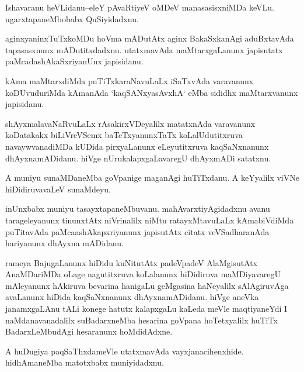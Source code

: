 \documentclass{article}
\begin{document}
\begin{mn}%
Ishavaranu heVLidanu--eleY pAvaRtiyeV oMDeV manasasisxniMDa keVLu. ugarxtapaneMbobabx 
QuSiyidadxnu.
\end{mn}

\begin{mn}%
aginxyaninxTuTxkoMDu hoVma mADutAtx aginx BakaSxkanAgi aduBxtavAda tapasasxnunx 
mADutitxdadxnu. utatxmavAda maMtarxgaLanunx japisutatx paMcadashAkaSxriyanUnx japisidanu.
\end{mn}

\begin{mn}%
kAma maMtarxdiMda puTiTxkaraNavuLaLx iSaTxvAda varavanunx koDUvuduriMda kAmanAda 
`kaqSANxyasAvxhA` eMba sididhx maMtarxvanunx japisidanu.
\end{mn}

\begin{mn}%
shAyxmalavaNaRvuLaLx rAsakirxVDeyalilx matatxnAda varavanunx koDatakakx biLiVreVSemx 
baTeTxyanunxTaTx koLalUdutitxruva navaywvanadiMDa kUDida pirxyaLanunx  eLeyutitxruva 
kaqSaNxnanunx dhAyxnamADidanu. hiVge nUrukalapxgaLavaregU dhAyxmADi satatxnu.
\end{mn}

\begin{mn}%
A muniyu sunaMDaneMba goVpanige maganAgi huTiTxdanu. A keYyalilx viVNe hiDidiruvavaLeV 
sunaMdeyu.
\end{mn}

\begin{mn}%
inUnxbabx muniyu tasayxtapaneMbuvanu. mahAvarxtiyAgidadxnu avanu tarageleyanunx tinunxtAtx 
niVrinalilx niMtu ratayxMtavuLaLx kAmabiVdiMda puTitavAda paMcaashAkapxriyanunx japisutAtx 
citatx veVSadharanAda hariyanunx dhAyxna mADidanu.
\end{mn}

\begin{mn}%
rameya BajugaLanunx hiDidu kuNitutAtx padeVpadeV AlaMgisutAtx AnaMDariMDa oLage 
nagutitxruva koLalanunx hiDidiruva maMDiyavaregU mAleyanunx hAkiruva bevarina hanigaLu 
geMgasina haNeyalilx sAlAgiruvAga avaLanunx hiDida kaqSaNxnanunx  dhAyxnamADidanu. hiVge 
aneVka janamxgaLAnu tALi konege hatutx kalapxgaLu kaLeda meVle maqtiyaneYdi I 
naMdanavanadalilx suBadarxneMba hesarina goVpana hoTetxyalilx huTiTx BadarxLeMbudAgi 
hesaranunx hoMdidAdxne.
\end{mn}

\begin{mn}%
A huDugiya paqSaThxdameVle utatxmavAda vayxjanacihenxhide. hidhAmaneMba matotxbabx 
muniyidadxnu.
\end{mn}
\end{document}
